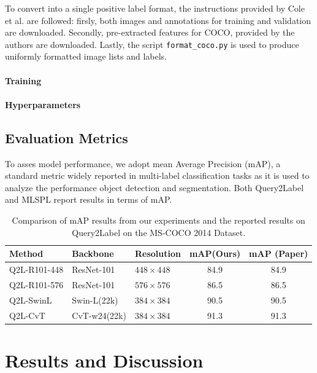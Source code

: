 \documentclass[lettersize,journal]{IEEEtran}
\begin{document}
To convert into a single positive label format, the instructions provided by Cole et al. are followed: firsly, both images and annotations for training and validation are downloaded. Secondly, pre-extracted features for COCO, provided by the authors are downloaded. Lastly, the script \texttt{format\_coco.py} is used to produce uniformly formatted image lists and labels.

\paragraph{Training}

\paragraph{Hyperparameters}

\subsection{Evaluation Metrics}
To asses model performance, we adopt mean Average Precision (mAP), a standard metric widely reported in multi-label classification tasks as it is used to analyze the performance object detection and segmentation. Both Query2Label and MLSPL report results in terms of mAP. 
\begin{table}[t]
    \small
    \caption{Comparison of mAP results from our experiments and the reported results on Query2Label on the MS-COCO 2014 Dataset.}
    \label{tab:q2l_map_comparison}
    \centering
    \begin{tabular}{l l l c c}
    \toprule
    \textbf{Method} & \textbf{Backbone} & \textbf{Resolution} & \textbf{mAP(Ours)} & \textbf{mAP (Paper)} \\
    \midrule
    Q2L-R101-448 & ResNet-101     & $448\times448$ & 84.9 & 84.9 \\
    Q2L-R101-576 & ResNet-101     & $576\times576$ & 86.5 & 86.5 \\
    Q2L-SwinL    & Swin-L(22k)    & $384\times384$ & 90.5 & 90.5 \\
    Q2L-CvT      & CvT-w24(22k)   & $384\times384$ & 91.3 & 91.3 \\
    \bottomrule
    \end{tabular}
\end{table}


\section{Results and Discussion}
\end{document}
